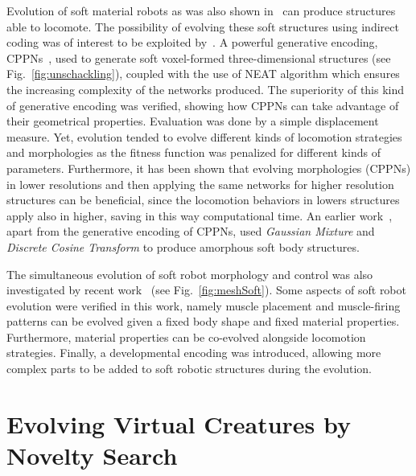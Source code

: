 Evolution of soft material robots as was also shown in~\citep{hiller2012automatic} can produce structures able to locomote. The possibility of evolving these soft structures using indirect coding was of interest to be exploited by~\citep{cheney2013unshackling}. A powerful generative encoding, CPPNs~\citep{stanley2007compositional}, used to generate soft voxel-formed three-dimensional structures (see Fig.~\ref{fig:unschackling}), coupled with the use of NEAT algorithm which ensures the increasing complexity of the networks produced. The superiority of this kind of generative encoding was verified, showing how CPPNs can take advantage of their geometrical properties. Evaluation was done by a simple displacement measure. Yet, evolution tended to evolve different kinds of locomotion strategies and morphologies as the fitness function was penalized for different kinds of parameters. Furthermore, it has been shown that evolving morphologies (CPPNs) in lower resolutions and then applying the same networks for higher resolution structures can be beneficial, since the locomotion behaviors in lowers structures apply also in higher, saving in this way computational time.  An earlier work~\citep{hiller2010evolving}, apart from the generative encoding of CPPNs, used \textit{Gaussian Mixture} and \textit{Discrete Cosine Transform} to produce amorphous soft body structures.

The simultaneous evolution of soft robot morphology and control was also investigated by recent work~\citep{rieffel2014growing} (see Fig.~\ref{fig:meshSoft}). Some aspects of soft robot evolution were verified in this work, namely muscle placement and muscle-firing patterns can be evolved given a fixed body shape and fixed material properties. Furthermore, material properties can be co-evolved alongside locomotion strategies. Finally, a developmental encoding was introduced, allowing more complex parts to be added to soft robotic structures during the evolution.


\section{Evolving Virtual Creatures by Novelty Search}

